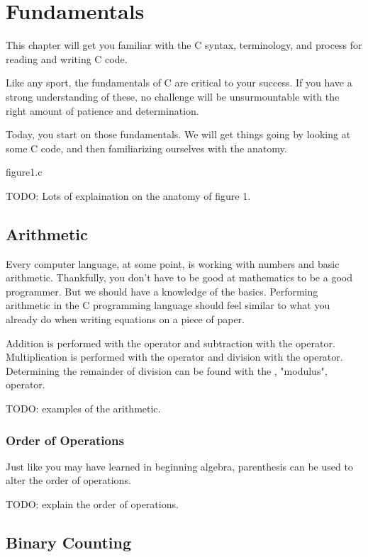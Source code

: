\chapter{Fundamentals}

This chapter will get you familiar with the C syntax, terminology, and
process for reading and writing C code.

Like any sport, the fundamentals of C are critical to your success. If you have
a strong understanding of these, no challenge will be unsurmountable with the
right amount of patience and determination.

Today, you start on those fundamentals. We will get things going by looking at
some C code, and then familiarizing ourselves with the anatomy.


\begin{code}{figure1.c}

\end{code}


TODO: Lots of explaination on the anatomy of figure 1.


\section{Arithmetic}

Every computer language, at some point, is working with numbers and basic
arithmetic. Thankfully, you don't have to be good at mathematics to be a good
programmer. But we should have a knowledge of the basics. Performing arithmetic
in the C programming language should feel similar to what you already do when
writing equations on a piece of paper.

Addition is performed with the \ident{+} operator and subtraction with the
\ident{-} operator. Multiplication is performed with the \ident{*} operator and
division with the \ident{/} operator. Determining the remainder of division can
be found with the \ident{\%}, "modulus", operator.

TODO: examples of the arithmetic.

\subsection{Order of Operations}

Just like you may have learned in beginning algebra, parenthesis can be used
to alter the order of operations.

TODO: explain the order of operations.

\section{Binary Counting}


